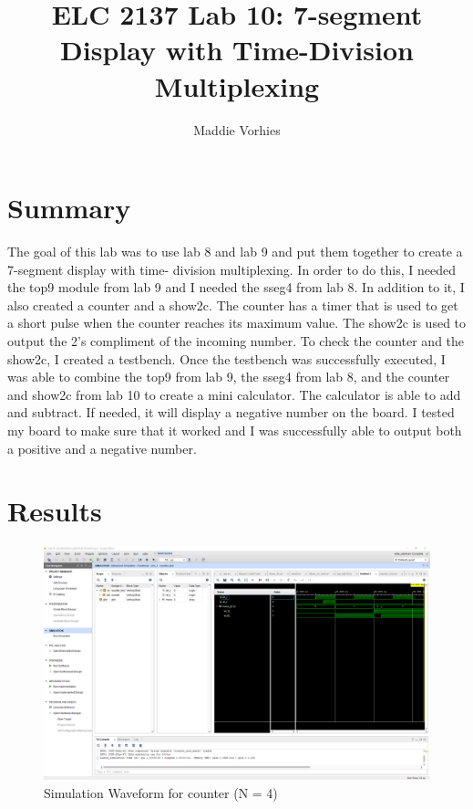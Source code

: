 \documentclass[11pt]{article}
\begin{document}
\title{ELC 2137 Lab 10: 7-segment Display with Time-Division Multiplexing}
\author{Maddie Vorhies}

\maketitle

\section*{Summary}

The goal of this lab was to use lab 8 and lab 9 and put them together to create a 7-segment display with time- division multiplexing. In order to do this, I needed the top9 module from lab 9 and I needed the sseg4 from lab 8. In addition to it, I also created a counter and a show2c. The counter has a timer that is used to get a short pulse when the counter reaches its maximum value. The show2c is used to output the 2's compliment of the incoming number. To check the counter and the show2c, I created a testbench. Once the testbench was successfully executed, I was able to combine the top9 from lab 9, the sseg4 from lab 8, and the counter and show2c from lab 10 to create a mini calculator. The calculator is able to add and subtract. If needed, it will display a negative number on the board. I tested my board to make sure that it worked and I was successfully able to output both a positive and a negative number.  


\section*{Results}

\begin{figure}[ht]\centering
	\caption{Simulation Waveform for counter (N = 4)}
	\includegraphics [width=1\textwidth,trim=640 550 10 135, clip]{counter_sim}
\end{figure}
\end{document}
